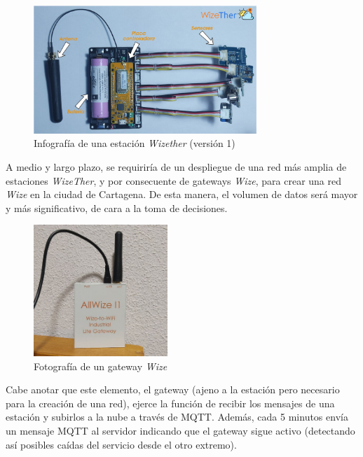 \documentclass[12pt]{article}
\begin{document}
 \begin{figure}[h]
 	\begin{center}
 		\includegraphics[width=0.75\textwidth]{img/info_wize_sensor_v1.png}
 		\caption{Infografía de una estación \textit{Wizether} (versión 1)}
 	\end{center}
 \end{figure}

\pagebreak

\noindent A medio y largo plazo, se requiriría de un despliegue de una red más amplia de estaciones \textit{WizeTher}, y por consecuente de gateways \textit{Wize}, para crear una red \textit{Wize} en la ciudad de Cartagena. De esta manera, el volumen de datos será mayor y más significativo, de cara a la toma de decisiones. \\

\begin{figure}[h]
	\begin{center}
		\includegraphics[width=0.45\textwidth]{img/gateway_wize.png}
		\caption{Fotografía de un gateway \textit{Wize}}
	\end{center}
\end{figure}

\noindent Cabe anotar que este elemento, el gateway (ajeno a la estación pero necesario para la creación de una red), ejerce la función de recibir los mensajes de una estación y subirlos a la nube a través de MQTT. Además, cada 5 minutos envía un mensaje MQTT al servidor indicando que el gateway sigue activo (detectando así posibles caídas del servicio desde el otro extremo). \\
\end{document}
